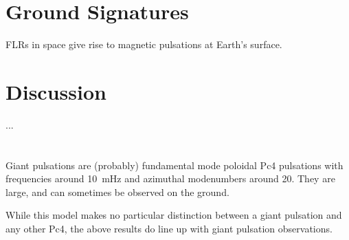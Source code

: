 
\section{Ground Signatures}

FLRs in space give rise to magnetic pulsations at Earth's surface. 





\section{Discussion}

... \\ \\ \\




Giant pulsations are (probably\cite{takahashi_2011}) fundamental mode poloidal Pc4 pulsations with frequencies around \SI{10}{\mHz} and azimuthal modenumbers around \num{20}. They are large, and can sometimes be observed on the ground. 

While this model makes no particular distinction between a giant pulsation and any other Pc4, the above results do line up with giant pulsation observations. 

